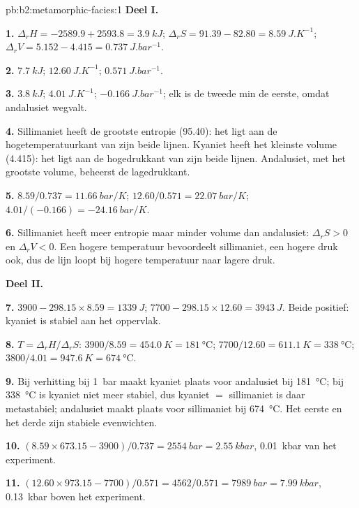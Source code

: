 \begin{solution}{pb:b2:metamorphic-facies:1}
\noindent\textbf{Deel I.}

\textbf{1.} $\Delta_r H = -2589.9 + 2593.8 = \qty{3.9}{kJ}$; $\Delta_r S = 91.39 - 82.80 =
\qty{8.59}{J.K^{-1}}$; $\Delta_r V = 5.152 - 4.415 = \qty{0.737}{J.bar^{-1}}$.

\textbf{2.} $\qty{7.7}{kJ}$; $\qty{12.60}{J.K^{-1}}$; $\qty{0.571}{J.bar^{-1}}$.

\textbf{3.} $\qty{3.8}{kJ}$; $\qty{4.01}{J.K^{-1}}$; $\qty{-0.166}{J.bar^{-1}}$; elk is
de tweede min de eerste, omdat andalusiet wegvalt.

\textbf{4.} Sillimaniet heeft de grootste entropie (95.40): het ligt aan de
hogetemperatuurkant van zijn beide lijnen. Kyaniet heeft het kleinste volume (4.415): het ligt aan de
hogedrukkant van zijn beide lijnen. Andalusiet, met het grootste volume, beheerst de
lagedrukkant.

\textbf{5.} $8.59/0.737 = \qty{11.66}{bar/K}$; $12.60/0.571 = \qty{22.07}{bar/K}$;
$4.01/(-0.166) = \qty{-24.16}{bar/K}$.

\textbf{6.} Sillimaniet heeft meer entropie maar minder volume dan andalusiet: $\Delta_r S > 0$
en $\Delta_r V < 0$. Een hogere temperatuur bevoordeelt sillimaniet, een hogere druk
ook, dus de lijn loopt bij hogere temperatuur naar lagere druk.

\noindent\textbf{Deel II.}

\textbf{7.} $3900 - 298.15\times8.59 = \qty{+1339}{J}$; $7700 - 298.15\times12.60 =
\qty{+3943}{J}$. Beide positief: kyaniet is stabiel aan het oppervlak.

\textbf{8.} $T = \Delta_r H/\Delta_r S$: $3900/8.59 = \qty{454.0}{K} = \qty{181}{\celsius}$;
$7700/12.60 = \qty{611.1}{K} = \qty{338}{\celsius}$; $3800/4.01 = \qty{947.6}{K} =
\qty{674}{\celsius}$.

\textbf{9.} Bij verhitting bij \qty{1}{bar} maakt kyaniet plaats voor andalusiet bij
\qty{181}{\celsius}; bij \qty{338}{\celsius} is kyaniet niet meer stabiel, dus kyaniet $=$
sillimaniet is daar metastabiel; andalusiet maakt plaats voor sillimaniet bij
\qty{674}{\celsius}. Het eerste en het derde zijn stabiele evenwichten.

\textbf{10.} $(8.59\times673.15 - 3900)/0.737 = \qty{2554}{bar} = \qty{2.55}{kbar}$,
\qty{0.01}{kbar} van het experiment.

\textbf{11.} $(12.60\times973.15 - 7700)/0.571 = 4562/0.571 = \qty{7989}{bar} =
\qty{7.99}{kbar}$, \qty{0.13}{kbar} boven het experiment.


\end{solution}

